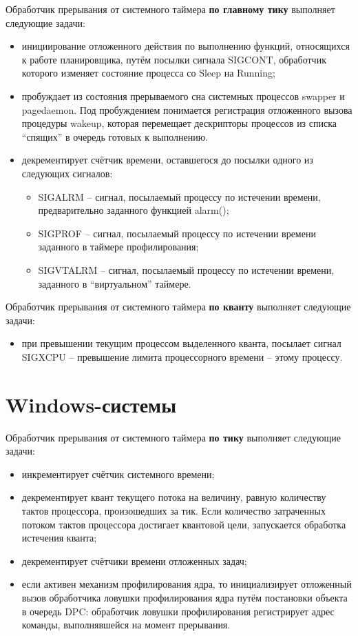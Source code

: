 Обработчик прерывания от системного таймера \textbf{по главному тику} выполняет следующие задачи:
\begin{itemize}
	\item инициирование отложенного действия по выполнению функций, относящихся к работе планировщика, путём посылки сигнала {\ttfamily SIGCONT}, обработчик которого изменяет состояние процесса со {\ttfamily Sleep} на {\ttfamily Running};
	\item пробуждает из состояния прерываемого сна системных процессов {\ttfamily swapper} и {\ttfamily pagedaemon}.  Под пробуждением понимается регистрация отложенного вызова процедуры wakeup, которая перемещает дескрипторы
процессов из списка “спящих” в очередь готовых к выполнению.
	\item декрементирует счётчик времени, оставшегося до посылки одного из следующих сигналов:
	\begin{itemize}
		\item {\ttfamily SIGALRM} – сигнал, посылаемый процессу по истечении времени, предварительно заданного функцией {\ttfamily alarm()};
		\item {\ttfamily SIGPROF} –  сигнал, посылаемый процессу по истечении времени заданного в таймере профилирования;
		\item {\ttfamily SIGVTALRM} –  сигнал, посылаемый процессу по истечении времени, заданного в ``виртуальном'' таймере.
	\end{itemize}
\end{itemize}

Обработчик прерывания от системного таймера \textbf{по кванту} выполняет следующие задачи:
\begin{itemize}
	\item при превышении текущим процессом выделенного кванта, посылает сигнал {\ttfamily SIGXCPU} -- превышение лимита процессорного времени -- этому процессу.
\end{itemize}

\section{Windows-системы}

Обработчик прерывания от системного таймера \textbf{по тику} выполняет следующие задачи:
\begin{itemize}
	\item инкрементирует счётчик системного времени;
	\item декрементирует квант текущего потока на величину, равную количеству тактов процессора, произошедших за тик. Если количество затраченных потоком тактов процессора достигает квантовой цели, запускается обработка истечения кванта;
	\item декрементирует счётчики времени отложенных задач;
	\item если активен механизм профилирования ядра, то инициализирует отложенный вызов обработчика ловушки профилирования ядра путём постановки объекта в очередь {\ttfamily DPC}: обработчик ловушки профилирования регистрирует адрес команды, выполнявшейся на момент прерывания. 
\end{itemize}

